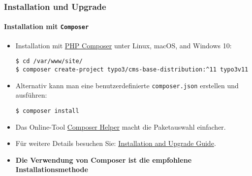 %

\begin{frame}[fragile]
	\frametitle{Installation und Upgrade}
	\framesubtitle{Installation mit \texttt{Composer}}


	\begin{itemize}
		\item Installation mit \href{https://getcomposer.org}{PHP Composer} unter Linux, macOS, and Windows 10:
\begin{lstlisting}
$ cd /var/www/site/
$ composer create-project typo3/cms-base-distribution:^11 typo3v11
\end{lstlisting}

		\item Alternativ kann man eine benutzerdefinierte \texttt{composer.json} erstellen und ausführen:
\begin{lstlisting}
$ composer install
\end{lstlisting}

		\item Das Online-Tool \href{https://get.typo3.org/misc/composer/helper}{Composer Helper}
			macht die Paketauswahl einfacher.

		\item Für weitere Details besuchen Sie:
			\href{https://docs.typo3.org/m/typo3/guide-installation/master/en-us/}{Installation and Upgrade Guide}.\newline

		\item \textbf{Die Verwendung von Composer ist die empfohlene Installationsmethode}

	\end{itemize}
\end{frame}

